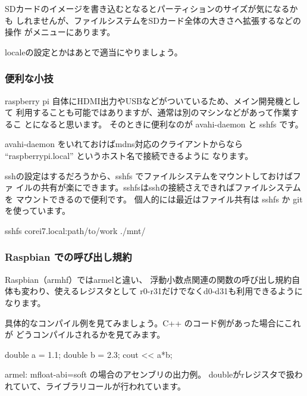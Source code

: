 \documentclass[mingoth,a4paper]{jsarticle}
\begin{document}
SDカードのイメージを書き込むとなるとパーティションのサイズが気になるかも
しれませんが、ファイルシステムをSDカード全体の大きさへ拡張するなどの操作
がメニューにあります。

localeの設定とかはあとで適当にやりましょう。

\subsubsection{便利な小技}

raspberry pi 自体にHDMI出力やUSBなどがついているため、メイン開発機として
利用することも可能ではありますが、通常は別のマシンなどがあって作業するこ
とになると思います。
そのときに便利なのが avahi-daemon と sshfs です。

avahi-daemon をいれておけばmdns対応のクライアントからなら
``raspberrypi.local'' というホスト名で接続できるように
なります。

sshの設定はするだろうから、sshfs でファイルシステムをマウントしておけばファ
イルの共有が楽にできます。sshfsはsshの接続さえできればファイルシステムを
マウントできるので便利です。
個人的には最近はファイル共有は sshfs か git を使っています。
\begin{commandline}
 sshfs corei7.local:path/to/work ./mnt/
\end{commandline}

\subsubsection{Raspbian での呼び出し規約}

Raspbian（armhf）ではarmelと違い、
浮動小数点関連の関数の呼び出し規約自体も変わり、使えるレジスタとして
r0-r31だけでなくd0-d31も利用できるようになります。

具体的なコンパイル例を見てみましょう。C++ のコード例があった場合にこれが
どうコンパイルされるかを見てみます。
\begin{commandline}
  double a = 1.1;
  double b = 2.3;
  cout << a*b;
\end{commandline}

armel: mfloat-abi=soft の場合のアセンブリの出力例。
doubleがrレジスタで扱われていて、ライブラリコールが行われています。

\end{document}
